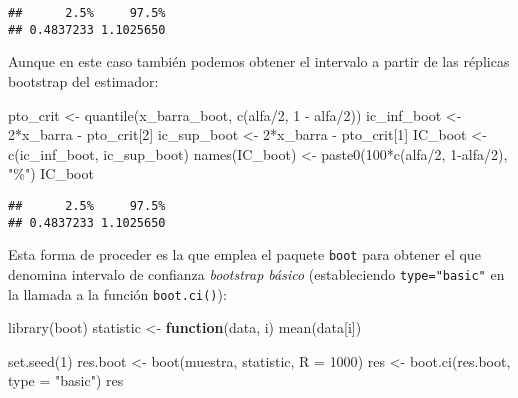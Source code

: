 \documentclass[
]{book}
\newenvironment{Shaded}{\begin{snugshade}}{\end{snugshade}}
\newcommand{\AttributeTok}[1]{\textcolor[rgb]{0.77,0.63,0.00}{#1}}
\newcommand{\ControlFlowTok}[1]{\textcolor[rgb]{0.13,0.29,0.53}{\textbf{#1}}}
\newcommand{\DecValTok}[1]{\textcolor[rgb]{0.00,0.00,0.81}{#1}}
\newcommand{\FunctionTok}[1]{\textcolor[rgb]{0.00,0.00,0.00}{#1}}
\newcommand{\NormalTok}[1]{#1}
\newcommand{\OtherTok}[1]{\textcolor[rgb]{0.56,0.35,0.01}{#1}}
\newcommand{\SpecialCharTok}[1]{\textcolor[rgb]{0.00,0.00,0.00}{#1}}
\newcommand{\StringTok}[1]{\textcolor[rgb]{0.31,0.60,0.02}{#1}}
\theoremstyle{break}
\theoremstyle{definition}
\theoremstyle{definition}
\theoremstyle{definition}
\theoremstyle{definition}
\theoremstyle{remark}
\begin{document}
\begin{verbatim}
##      2.5%     97.5% 
## 0.4837233 1.1025650
\end{verbatim}

Aunque en este caso también podemos obtener el intervalo a
partir de las réplicas bootstrap del estimador:

\begin{Shaded}
\begin{Highlighting}[]
\NormalTok{pto\_crit }\OtherTok{\textless{}{-}} \FunctionTok{quantile}\NormalTok{(x\_barra\_boot, }\FunctionTok{c}\NormalTok{(alfa}\SpecialCharTok{/}\DecValTok{2}\NormalTok{, }\DecValTok{1} \SpecialCharTok{{-}}\NormalTok{ alfa}\SpecialCharTok{/}\DecValTok{2}\NormalTok{))}
\NormalTok{ic\_inf\_boot }\OtherTok{\textless{}{-}} \DecValTok{2}\SpecialCharTok{*}\NormalTok{x\_barra }\SpecialCharTok{{-}}\NormalTok{ pto\_crit[}\DecValTok{2}\NormalTok{]}
\NormalTok{ic\_sup\_boot }\OtherTok{\textless{}{-}} \DecValTok{2}\SpecialCharTok{*}\NormalTok{x\_barra }\SpecialCharTok{{-}}\NormalTok{ pto\_crit[}\DecValTok{1}\NormalTok{]}
\NormalTok{IC\_boot }\OtherTok{\textless{}{-}} \FunctionTok{c}\NormalTok{(ic\_inf\_boot, ic\_sup\_boot)}
\FunctionTok{names}\NormalTok{(IC\_boot) }\OtherTok{\textless{}{-}} \FunctionTok{paste0}\NormalTok{(}\DecValTok{100}\SpecialCharTok{*}\FunctionTok{c}\NormalTok{(alfa}\SpecialCharTok{/}\DecValTok{2}\NormalTok{, }\DecValTok{1}\SpecialCharTok{{-}}\NormalTok{alfa}\SpecialCharTok{/}\DecValTok{2}\NormalTok{), }\StringTok{"\%"}\NormalTok{)}
\NormalTok{IC\_boot}
\end{Highlighting}
\end{Shaded}

\begin{verbatim}
##      2.5%     97.5% 
## 0.4837233 1.1025650
\end{verbatim}

Esta forma de proceder es la que emplea el paquete \texttt{boot} para obtener
el que denomina intervalo de confianza \emph{bootstrap básico}
(estableciendo \texttt{type="basic"} en la llamada a la función \texttt{boot.ci()}):

\begin{Shaded}
\begin{Highlighting}[]
\FunctionTok{library}\NormalTok{(boot)}
\NormalTok{statistic }\OtherTok{\textless{}{-}} \ControlFlowTok{function}\NormalTok{(data, i) }\FunctionTok{mean}\NormalTok{(data[i])}

\FunctionTok{set.seed}\NormalTok{(}\DecValTok{1}\NormalTok{)}
\NormalTok{res.boot }\OtherTok{\textless{}{-}} \FunctionTok{boot}\NormalTok{(muestra, statistic, }\AttributeTok{R =} \DecValTok{1000}\NormalTok{)}
\NormalTok{res }\OtherTok{\textless{}{-}} \FunctionTok{boot.ci}\NormalTok{(res.boot, }\AttributeTok{type =} \StringTok{"basic"}\NormalTok{)}
\NormalTok{res}
\end{Highlighting}
\end{Shaded}
\end{document}

